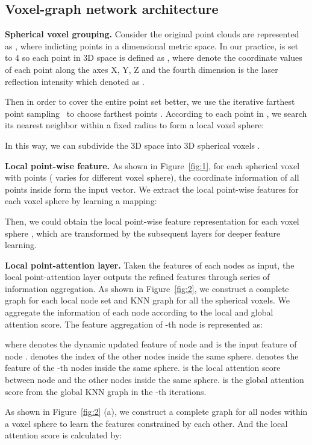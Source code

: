 \documentclass{article}
\begin{document}
\subsection{Voxel-graph network architecture}
\textbf{Spherical voxel grouping.} Consider the original point clouds are represented as , where  indicting  points in a  dimensional metric space. In our practice,  is set to 4 so each point in 3D space is defined as , where  denote the coordinate values of each point along the axes X, Y, Z and the fourth dimension is the laser reflection intensity which denoted as .

Then in order to cover the entire point set better, we use the iterative farthest point sampling~\cite{qi2017pointnet++} to choose  farthest points . According to each point in , we search its nearest neighbor within a fixed radius  to form a local voxel sphere:

In this way, we can subdivide the 3D space into  3D spherical voxels .

\textbf{Local point-wise feature.} As shown in Figure~\ref{fig:1}, for each spherical voxel  with  points ( varies for different voxel sphere), the coordinate information of all points inside form the input vector. We extract the local point-wise features for each voxel sphere by learning a mapping:

Then, we could obtain the local point-wise feature representation for each voxel sphere , which are transformed by the subsequent layers for deeper feature learning.

\textbf{Local point-attention layer.} Taken the features of each nodes as input, the local point-attention layer outputs the refined features  through series of information aggregation. As shown in Figure~\ref{fig:2}, we construct a complete graph for each local node set and KNN graph for all the spherical voxels. We aggregate the information of each node according to the local and global attention score. The feature aggregation of -th node is represented as:

where  denotes the dynamic updated feature of node  and  is the input feature of node .  denotes the index of the other nodes inside the same sphere.  denotes the feature of the -th nodes inside the same sphere.  is the local attention score between node  and the other nodes inside the same sphere.  is the global attention score from the global KNN graph in the -th iterations.

As shown in Figure~\ref{fig:2} (a), we construct a complete graph for all nodes within a voxel sphere to learn the features constrained by each other. And the local attention score  is calculated by:
\end{document}
